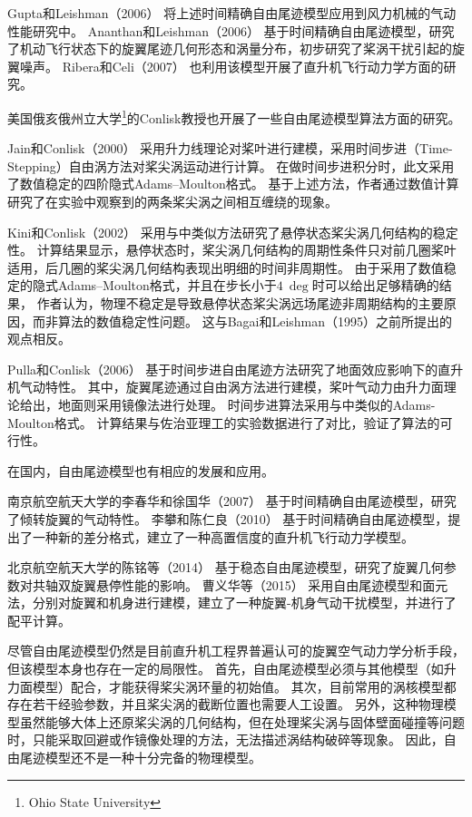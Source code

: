 \documentclass[doctor,openright,twoside,color]{buaathesis}
\begin{document}
Gupta和Leishman（2006）
将上述时间精确自由尾迹模型应用到风力机械的气动性能研究中。
%
Ananthan和Leishman（2006）
基于时间精确自由尾迹模型，研究了机动飞行状态下的旋翼尾迹几何形态和涡量分布，初步研究了桨涡干扰引起的旋翼噪声。
Ribera和Celi（2007）
也利用该模型开展了直升机飞行动力学方面的研究。

美国俄亥俄州立大学\footnote{Ohio State University}的Conlisk教授也开展了一些自由尾迹模型算法方面的研究。

Jain和Conlisk（2000）
采用升力线理论对桨叶进行建模，采用时间步进（Time-Stepping）自由涡方法对桨尖涡运动进行计算。
在做时间步进积分时，此文采用了数值稳定的四阶隐式Adams–Moulton格式。
基于上述方法，作者通过数值计算研究了在实验中观察到的两条桨尖涡之间相互缠绕的现象。

Kini和Conlisk（2002）
采用与\cite{Jain2000}中类似方法研究了悬停状态桨尖涡几何结构的稳定性。
计算结果显示，悬停状态时，桨尖涡几何结构的周期性条件只对前几圈桨叶适用，后几圈的桨尖涡几何结构表现出明细的时间非周期性。
由于采用了数值稳定的隐式Adams–Moulton格式，并且在步长小于$4~\deg$时可以给出足够精确的结果，
作者认为，物理不稳定是导致悬停状态桨尖涡远场尾迹非周期结构的主要原因，而非算法的数值稳定性问题。
这与Bagai和Leishman（1995）之前所提出的观点相反。

Pulla和Conlisk（2006）
基于时间步进自由尾迹方法研究了地面效应影响下的直升机气动特性。
其中，旋翼尾迹通过自由涡方法进行建模，桨叶气动力由升力面理论给出，地面则采用镜像法进行处理。
时间步进算法采用与\cite{Jain2000,Kini2002}中类似的Adams-Moulton格式。
计算结果与佐治亚理工的实验数据进行了对比，验证了算法的可行性。

在国内，自由尾迹模型也有相应的发展和应用。

南京航空航天大学的李春华和徐国华（2007）
基于时间精确自由尾迹模型，研究了倾转旋翼的气动特性。
%
李攀和陈仁良（2010）
基于时间精确自由尾迹模型，提出了一种新的差分格式，建立了一种高置信度的直升机飞行动力学模型。

北京航空航天大学的陈铭等（2014）
基于稳态自由尾迹模型，研究了旋翼几何参数对共轴双旋翼悬停性能的影响。
%
曹义华等（2015）
采用自由尾迹模型和面元法，分别对旋翼和机身进行建模，建立了一种旋翼-机身气动干扰模型，并进行了配平计算。

尽管自由尾迹模型仍然是目前直升机工程界普遍认可的旋翼空气动力学分析手段，但该模型本身也存在一定的局限性。
首先，自由尾迹模型必须与其他模型（如升力面模型）配合，才能获得桨尖涡环量的初始值。
其次，目前常用的涡核模型都存在若干经验参数，并且桨尖涡的截断位置也需要人工设置。
另外，这种物理模型虽然能够大体上还原桨尖涡的几何结构，但在处理桨尖涡与固体壁面碰撞等问题时，只能采取回避或作镜像处理的方法，无法描述涡结构破碎等现象。
因此，自由尾迹模型还不是一种十分完备的物理模型。
\end{document}
